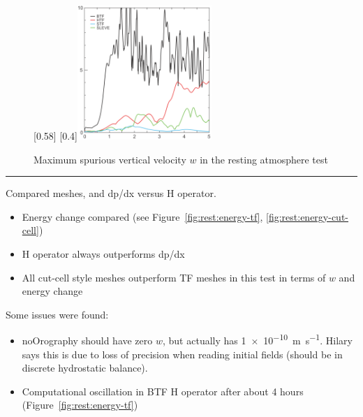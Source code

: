 
\begin{figure}
	\captionsetup[subfigure]{position=b}
	\centering
	[0.58\textwidth]{}
	\hfill
	[0.4\textwidth]{\vspace{0.27in}\includegraphics[height=2in]{img/klemp-w.png}}
	\caption{Maximum spurious vertical velocity $w$ in the resting atmosphere test}
	\label{fig:resting:w}
\end{figure}


\hrule

Compared meshes, and dp/dx versus H operator.

\begin{itemize}
\item Energy change compared (see Figure~\ref{fig:rest:energy-tf}, \ref{fig:rest:energy-cut-cell})
\item H operator always outperforms dp/dx
\item All cut-cell style meshes outperform TF meshes in this test in terms of $w$ and energy change
\end{itemize}
Some issues were found:
\begin{itemize}
\item noOrography should have zero $w$, but actually has \SI{1e-10}{\meter\per\second}.  Hilary says this is due to loss of precision when reading initial fields (should be in discrete hydrostatic balance).
\item Computational oscillation in BTF H operator after about 4 hours (Figure~\ref{fig:rest:energy-tf})
\end{itemize}

